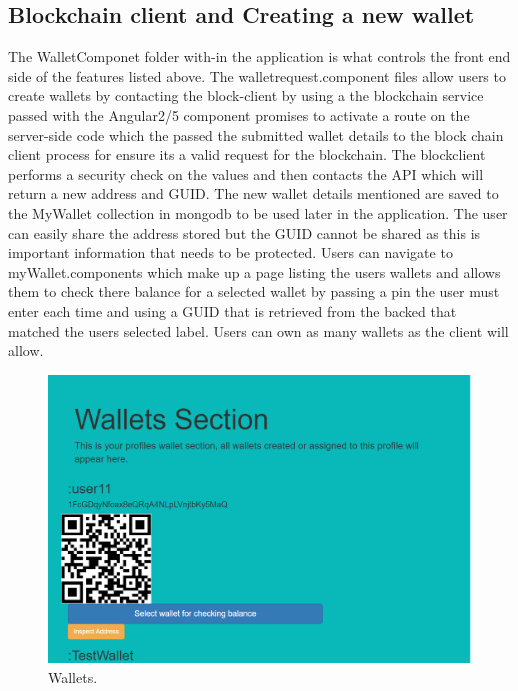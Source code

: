 \subsection{Blockchain client and Creating a new wallet}
The WalletComponet folder with-in the application is what controls the front end side of the features listed above. The walletrequest.component files allow users to create wallets by contacting the block-client by using a the blockchain service passed with the Angular2/5 component promises to activate a route on the server-side code which the passed the submitted wallet details to the block chain client process for ensure its a valid request for the blockchain. The blockclient performs a security check on the values and then contacts the API which will return a new address and GUID. The new wallet details mentioned are saved to the MyWallet collection in mongodb to be used later in the application. The user can easily share the address stored but the GUID cannot be shared as this is important information that needs to be protected. Users can navigate to myWallet.components which make up a page listing the users wallets and allows them to check there balance for a selected wallet by passing a pin the user must enter each time and using a GUID that is retrieved from the backed that matched the users selected label. Users can own as many wallets as the client will allow.

\begin{figure}[H]
\centering
\includegraphics[]{img/wallets.png}
\caption{Wallets.}
\end{figure}


